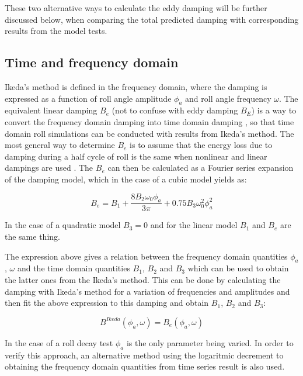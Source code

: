     These two alternative ways to calculate the eddy damping will be further
discussed below, when comparing the total predicted damping with
corresponding results from the model tests.

    \subsection{Time and frequency domain}\label{time-and-frequency-domain}

Ikeda's method is defined in the frequency domain, where the damping is
expressed as a function of roll angle amplitude \(\phi_a\) and roll
angle frequency \(\omega\). The equivalent linear damping \(B_e\) (not
to confuse with eddy damping \(B_E\)) is a way to convert the frequency
domain damping into time domain damping \cite{7505983/FB64RGPF}, so that
time domain roll simulations can be conducted with results from Ikeda's
method. The most general way to determine \(B_e\) is to assume that the
energy loss due to damping during a half cycle of roll is the same when
nonlinear and linear dampings are used \cite{7505983/RYUBZITQ}. The
\(B_e\) can then be calculated as a Fourier series expansion of the
damping model, which in the case of a cubic model yields as:
 
            
    
    \begin{equation}
B_{e} = B_{1} + \frac{8 B_{2} \omega_{0} \phi_{a}}{3 \pi} + 0.75 B_{3} \omega_{0}^{2} \phi_{a}^{2}
\label{eq:equation}
\end{equation}

    

    In the case of a quadratic model \(B_3=0\) and for the linear model
\(B_1\) and \(B_e\) are the same thing.

    The expression above gives a relation between the frequency domain
quantities \(\phi_a\), \(\omega\) and the time domain quantities
\(B_1\), \(B_2\) and \(B_3\) which can be used to obtain the latter ones
from the Ikeda's method. This can be done by calculating the damping
with Ikeda's method for a variation of frequencies and amplitudes and
then fit the above expression to this damping and obtain \(B_1\),
\(B_2\) and \(B_3\):

\[B^{Ikeda}(\phi_a, \omega) = B_e(\phi_a, \omega)\]

In the case of a roll decay test \(\phi_a\) is the only parameter being
varied. In order to verify this approach, an alternative method using
the logaritmic decrement \cite{7505983/BYNJ8CFG} to obtaining the
frequency domain quantities from time series result is also used.

